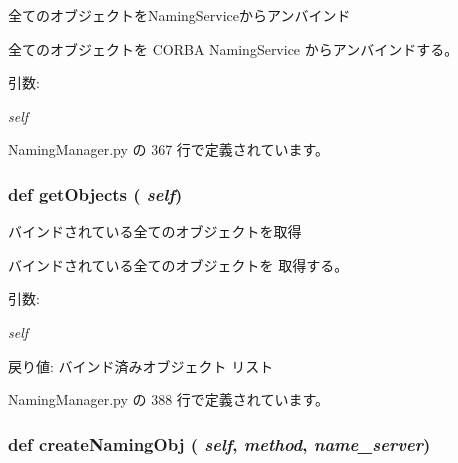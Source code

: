 全てのオブジェクトをNamingServiceからアンバインド 

全てのオブジェクトを CORBA NamingService からアンバインドする。

\begin{Desc}
\item[引数:]
\begin{description}
\item[{\em self}]\end{description}
\end{Desc}


 NamingManager.py の 367 行で定義されています。
\subsubsection{\setlength{\rightskip}{0pt plus 5cm}def getObjects ( {\em self})}\label{classsource__py_1_1_naming_manager_1_1_naming_manager_38d28fb49e2d3f0c5b1ce9ba7fa66864}


バインドされている全てのオブジェクトを取得 

バインドされている全てのオブジェクトを 取得する。

\begin{Desc}
\item[引数:]
\begin{description}
\item[{\em self}]\end{description}
\end{Desc}
\begin{Desc}
\item[戻り値:]バインド済みオブジェクト リスト \end{Desc}


 NamingManager.py の 388 行で定義されています。
\subsubsection{\setlength{\rightskip}{0pt plus 5cm}def createNamingObj ( {\em self},  {\em method},  {\em name\_\-server})}\label{classsource__py_1_1_naming_manager_1_1_naming_manager_e4e07d4a4b8a26464fa6ffb20ac8ec30}


